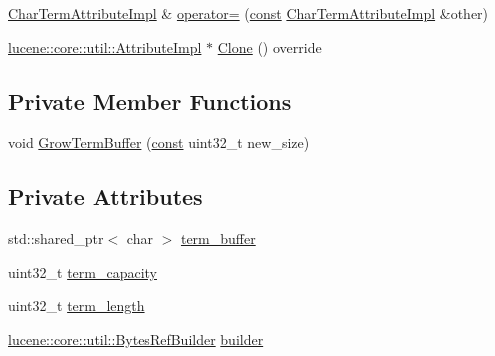 \begin{DoxyCompactItemize}
\item 
\mbox{\hyperlink{classlucene_1_1core_1_1analysis_1_1tokenattributes_1_1CharTermAttributeImpl}{Char\+Term\+Attribute\+Impl}} \& \mbox{\hyperlink{classlucene_1_1core_1_1analysis_1_1tokenattributes_1_1CharTermAttributeImpl_a4a53d4368af86441243246af1722390f}{operator=}} (\mbox{\hyperlink{ZlibCrc32_8h_a2c212835823e3c54a8ab6d95c652660e}{const}} \mbox{\hyperlink{classlucene_1_1core_1_1analysis_1_1tokenattributes_1_1CharTermAttributeImpl}{Char\+Term\+Attribute\+Impl}} \&other)
\item 
\mbox{\hyperlink{classlucene_1_1core_1_1util_1_1AttributeImpl}{lucene\+::core\+::util\+::\+Attribute\+Impl}} $\ast$ \mbox{\hyperlink{classlucene_1_1core_1_1analysis_1_1tokenattributes_1_1CharTermAttributeImpl_a518bf3f405ddf676ee58fccb02ae3c23}{Clone}} () override
\end{DoxyCompactItemize}
\subsection*{Private Member Functions}
\begin{DoxyCompactItemize}
\item 
void \mbox{\hyperlink{classlucene_1_1core_1_1analysis_1_1tokenattributes_1_1CharTermAttributeImpl_a4e54d600b1368df46af61c9bdae71cc0}{Grow\+Term\+Buffer}} (\mbox{\hyperlink{ZlibCrc32_8h_a2c212835823e3c54a8ab6d95c652660e}{const}} uint32\+\_\+t new\+\_\+size)
\end{DoxyCompactItemize}
\subsection*{Private Attributes}
\begin{DoxyCompactItemize}
\item 
std\+::shared\+\_\+ptr$<$ char $>$ \mbox{\hyperlink{classlucene_1_1core_1_1analysis_1_1tokenattributes_1_1CharTermAttributeImpl_a9a4ece35b434c726c23ea3e1f0b46514}{term\+\_\+buffer}}
\item 
uint32\+\_\+t \mbox{\hyperlink{classlucene_1_1core_1_1analysis_1_1tokenattributes_1_1CharTermAttributeImpl_aa62aff36d884a989746a4de2cc12e921}{term\+\_\+capacity}}
\item 
uint32\+\_\+t \mbox{\hyperlink{classlucene_1_1core_1_1analysis_1_1tokenattributes_1_1CharTermAttributeImpl_a746eb5a710afd01df9c4170ea0e0ce3e}{term\+\_\+length}}
\item 
\mbox{\hyperlink{classlucene_1_1core_1_1util_1_1BytesRefBuilder}{lucene\+::core\+::util\+::\+Bytes\+Ref\+Builder}} \mbox{\hyperlink{classlucene_1_1core_1_1analysis_1_1tokenattributes_1_1CharTermAttributeImpl_a1599ca8cd8221d3970fdb6d3d5f763a9}{builder}}
\end{DoxyCompactItemize}
